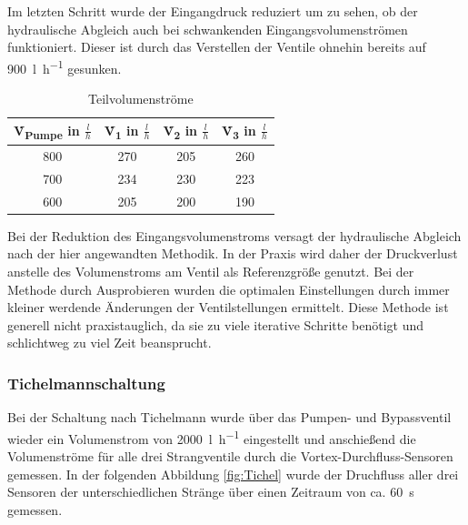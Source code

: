 Im letzten Schritt wurde der Eingangdruck reduziert um zu sehen, ob der hydraulische Abgleich auch bei schwankenden Eingangsvolumenströmen funktioniert. Dieser ist durch das Verstellen der Ventile ohnehin bereits auf \SI{900}{\litre\per\hour} gesunken.

\begin{table}[H]
	\centering
	\caption{Teilvolumenströme}
	\begin{tabular}{cccc}
		\label{tab:komp2}
		
		\textbf{\.V\textsubscript{Pumpe}} in $\frac{l}{h}$ & \textbf{\.V\textsubscript{1}} in $\frac{l}{h}$ & \textbf{\.V\textsubscript{2}} in $\frac{l}{h}$ & \textbf{\.V\textsubscript{3}} in $\frac{l}{h}$\\
		\hline
		800 & 270 & 205 & 260\\
		700 & 234 & 230 & 223\\
		600 & 205 & 200 & 190\\
	\end{tabular}
\end{table}

Bei der Reduktion des Eingangsvolumenstroms versagt der hydraulische Abgleich nach der hier angewandten Methodik. In der Praxis wird daher der Druckverlust anstelle des Volumenstroms am Ventil als Referenzgröße genutzt. Bei der Methode durch Ausprobieren wurden die optimalen Einstellungen durch immer kleiner werdende Änderungen der Ventilstellungen ermittelt. Diese Methode ist generell nicht praxistauglich, da sie zu viele iterative Schritte benötigt und schlichtweg zu viel Zeit beansprucht.

\subsubsection{Tichelmannschaltung}

Bei der Schaltung nach Tichelmann wurde über das Pumpen- und Bypassventil wieder ein Volumenstrom von \SI{2000}{\litre\per\hour} eingestellt und anschießend die Volumenströme für alle drei Strangventile durch die Vortex-Durchfluss-Sensoren gemessen. In der folgenden Abbildung \ref{fig:Tichel} wurde der Druchfluss aller drei Sensoren der unterschiedlichen Stränge über einen Zeitraum von ca. \SI{60}{\second} gemessen.

